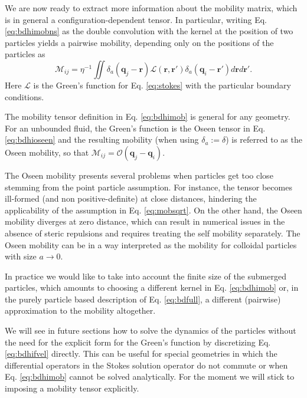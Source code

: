 \documentclass[twoside,openright,titlepage,numbers=noenddot,%
headinclude,footinclude,cleardoublepage=empty,abstract=on,
BCOR=5mm,fontsize=11pt, dvipsnames, paper=b5
]{scrreprt}
\renewcommand{\vec}[1]{\bm{#1}}
\newcommand{\tens}[1]{\bm{\mathcal{#1}}}
\newcommand{\oper}[1]{\mathcal{#1}}
\newcommand{\ppos}{q}
\begin{document}
We are now ready to extract more information about the mobility matrix, which is in general a configuration-dependent tensor. In particular, writing Eq. \eqref{eq:bdhimobns} as the double convolution with the kernel at the position of two particles yields a pairwise mobility, depending only on the positions of the particles as
\begin{equation}
  \label{eq:bdhimob}
  \tens{M}_{ij} = \eta^{-1}\iint{\delta_a(\vec{q}_j-\vec{r})\oper{L}(\vec{r}, \vec{r}')\delta_a(\vec{q}_i -\vec{r}')d\vec{r}d\vec{r}'}.
\end{equation}
Here $\oper{L}$ is the Green's function for Eq. \eqref{eq:stokes} with the particular boundary conditions.

The mobility tensor definition in Eq. \eqref{eq:bdhimob} is general for any geometry. For an unbounded fluid, the Green's function is the Oseen tensor in Eq. \eqref{eq:bdhioseen} and the resulting mobility (when using $\delta_a:=\delta$) is referred to as the Oseen mobility, so that $\tens{M}_{ij} = \tens{O}(\vec{\ppos}_j - \vec{\ppos}_i)$.

The Oseen mobility presents several problems when particles get too close stemming from the point particle assumption. For instance, the tensor becomes ill-formed (and non positive-definite) at close distances, hindering the applicability of the assumption in Eq. \eqref{eq:mobsqrt}. On the other hand, the Oseen mobility diverges at zero distance, which can result in numerical issues in the absence of steric repulsions and requires treating the self mobility separately. The Oseen mobility can be in a way interpreted as the mobility for colloidal particles with size $a\rightarrow 0$.

In practice we would like to take into account the finite size of the submerged particles, which amounts to choosing a different kernel in Eq. \eqref{eq:bdhimob} or, in the purely particle based description of Eq. \eqref{eq:bdfull}, a different (pairwise) approximation to the mobility altogether.

We will see in future sections how to solve the dynamics of the particles without the need for the explicit form for the Green's function by discretizing Eq. \eqref{eq:bdhifvel} directly. This can be useful for special geometries in which the differential operators in the Stokes solution operator do not commute or when Eq. \eqref{eq:bdhimob} cannot be solved analytically. For the moment we will stick to imposing a mobility tensor explicitly.
\end{document}
